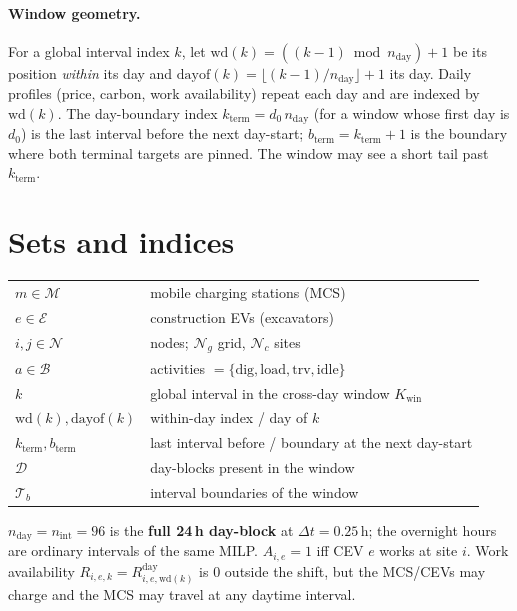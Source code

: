 \documentclass[11pt]{article}
\newcommand{\dt}{\Delta t}
\begin{document}
\paragraph{Window geometry.} For a global interval index $k$, let
$\mathrm{wd}(k)=((k-1)\bmod n_{\text{day}})+1$ be its position \emph{within} its day and
$\mathrm{dayof}(k)=\lfloor(k-1)/n_{\text{day}}\rfloor+1$ its day. Daily profiles (price,
carbon, work availability) repeat each day and are indexed by $\mathrm{wd}(k)$. The
day-boundary index $k_{\text{term}}=d_0\,n_{\text{day}}$ (for a window whose first day is $d_0$)
is the last interval before the next day-start; $b_{\text{term}}=k_{\text{term}}+1$ is the boundary
where both terminal targets are pinned. The window may see a short tail past $k_{\text{term}}$.

\section{Sets and indices}
\begin{tabular}{ll}
$m \in \mathcal{M}$ & mobile charging stations (MCS) \\
$e \in \mathcal{E}$ & construction EVs (excavators) \\
$i,j \in \mathcal{N}$ & nodes; $\mathcal{N}_g$ grid, $\mathcal{N}_c$ sites \\
$a \in \mathcal{B}$ & activities $=\{\text{dig},\text{load},\text{trv},\text{idle}\}$ \\
$k$ & global interval in the cross-day window $K_{\text{win}}$ \\
$\mathrm{wd}(k),\mathrm{dayof}(k)$ & within-day index / day of $k$ \\
$k_{\text{term}},b_{\text{term}}$ & last interval before / boundary at the next day-start \\
$\mathcal{D}$ & day-blocks present in the window \\
$\mathcal{T}_b$ & interval boundaries of the window \\
\end{tabular}

\medskip
$n_{\text{day}}=n_{\text{int}}=96$ is the \textbf{full 24\,h day-block} at $\dt=0.25$\,h;
the overnight hours are ordinary intervals of the same MILP. $A_{i,e}=1$
iff CEV $e$ works at site $i$. Work availability $R_{i,e,k}=R^{\text{day}}_{i,e,\mathrm{wd}(k)}$
is $0$ outside the shift, but the MCS/CEVs may charge and the MCS may travel at any
daytime interval.
\end{document}
